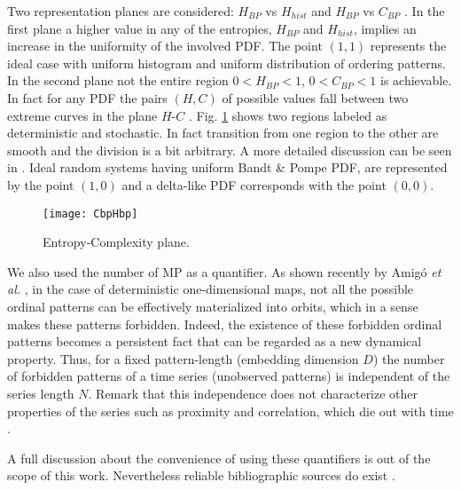 Two representation planes are considered: $H_{BP}$ vs $H_{hist}$ \cite{DeMicco2008} and $H_{BP}$ vs $C_{BP}$ \cite{Rosso2007}.
In the first plane a higher value in any of the entropies, $H_{BP}$ and $H_{hist}$, implies an increase in the uniformity of the involved PDF.
The point $(1,1)$ represents the ideal case with uniform histogram and uniform distribution of ordering patterns.
In the second plane not the entire region $0<H_{BP}<1$, $0<C_{BP}<1$ is achievable.
In fact for any PDF the pairs $(H,C)$ of possible values fall between two extreme curves in the plane $H$-$C$ \cite{Anteneodo1996}.
Fig. \ref{fig:CbpHbp} shows two regions labeled as deterministic and stochastic. In fact transition from one region to the other are smooth and the division is a bit arbitrary. 
A more detailed discussion can be seen in \cite{Rosso2007}. 
Ideal random systems having uniform Bandt \& Pompe PDF, are represented by the point $(1,0)$ \cite{Gonzalez2005} and a delta-like PDF corresponds with the point $(0,0)$.

\begin{figure}
\centering	
	\texttt{[image: CbpHbp]}
	\caption{Entropy-Complexity plane.}
	\label{fig:CbpHbp}
\end{figure}

We also used the number of MP as a quantifier\cite{Rosso2012}.
As shown recently by Amig\'o {\it et al.} \cite{Amigo2006,Amigo2007,Amigo2008,Amigo2010}, in the case of deterministic one-dimensional maps, not all the possible ordinal patterns can be effectively materialized into orbits, which in a sense makes these patterns forbidden.
Indeed, the existence of these forbidden ordinal patterns becomes a persistent fact that can be regarded as a new dynamical property.
Thus, for a fixed pattern-length (embedding dimension $D$) the number of forbidden patterns of a time series (unobserved patterns) is independent of the series length $N$.
Remark that this independence does not characterize other properties of the series such as proximity and correlation, which die out with time \cite{Amigo2007,Amigo2010}.

A full discussion about the convenience of using these quantifiers is out of the scope of this work.
Nevertheless reliable bibliographic sources do exist \cite{Wackerbauer1994,Lopez-Ruiz1995,Rosso2007A,DeMicco2008,Rosso2010,Martin2006,Rosso2012}.